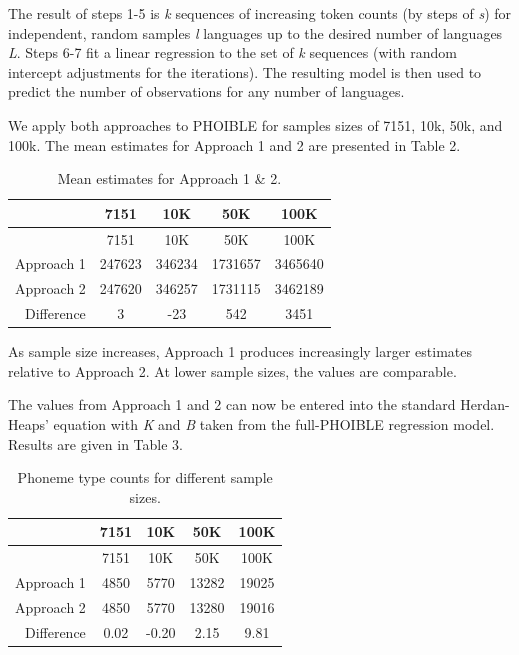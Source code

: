 \documentclass[
]{article}
\begin{document}
The result of steps 1-5 is \emph{k} sequences of increasing token counts
(by steps of \emph{s}) for independent, random samples \emph{l}
languages up to the desired number of languages \emph{L}. Steps 6-7 fit
a linear regression to the set of \textit{k} sequences (with random
intercept adjustments for the iterations). The resulting model is then
used to predict the number of observations for any number of languages.

We apply both approaches to PHOIBLE for samples sizes of 7151, 10k, 50k,
and 100k. The mean estimates for Approach 1 and 2 are presented in Table
2.

\begin{longtable}[]{@{}rcccc@{}}
\caption{Mean estimates for Approach 1 \& 2.}\tabularnewline
\toprule\noalign{}
& 7151 & 10K & 50K & 100K \\
\midrule\noalign{}
\endfirsthead
\toprule\noalign{}
& 7151 & 10K & 50K & 100K \\
\midrule\noalign{}
\endhead
\bottomrule\noalign{}
\endlastfoot
Approach 1 & 247623 & 346234 & 1731657 & 3465640 \\
Approach 2 & 247620 & 346257 & 1731115 & 3462189 \\
Difference & 3 & -23 & 542 & 3451 \\
\end{longtable}

As sample size increases, Approach 1 produces increasingly larger
estimates relative to Approach 2. At lower sample sizes, the values are
comparable.

The values from Approach 1 and 2 can now be entered into the standard
Herdan-Heaps' equation with \emph{K} and \emph{B} taken from the
full-PHOIBLE regression model. Results are given in Table 3.

\begin{longtable}[]{@{}rcccc@{}}
\caption{Phoneme type counts for different sample sizes.}\tabularnewline
\toprule\noalign{}
& 7151 & 10K & 50K & 100K \\
\midrule\noalign{}
\endfirsthead
\toprule\noalign{}
& 7151 & 10K & 50K & 100K \\
\midrule\noalign{}
\endhead
\bottomrule\noalign{}
\endlastfoot
Approach 1 & 4850 & 5770 & 13282 & 19025 \\
Approach 2 & 4850 & 5770 & 13280 & 19016 \\
Difference & 0.02 & -0.20 & 2.15 & 9.81 \\
\end{longtable}
\end{document}
